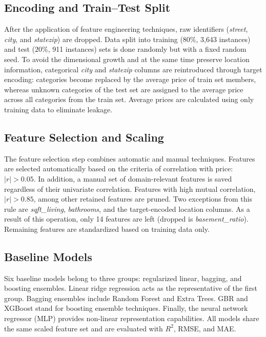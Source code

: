 \documentclass[conference]{IEEEtran}
\begin{document}
\subsection{Encoding and Train–Test Split}
After the application of feature engineering techniques, raw identifiers (\textit{street}, \textit{city}, and \textit{statezip}) are dropped. Data split into training ($80\%$, 3,643 instances) and test ($20\%$, 911 instances) sets is done randomly but with a fixed random seed. To avoid the dimensional growth and at the same time preserve location information, categorical \textit{city} and \textit{statezip} columns are reintroduced through target encoding: categories become replaced by the average price of train set members, whereas unknown categories of the test set are assigned to the average price across all categories from the train set. Average prices are calculated using only training data to eliminate leakage. 

\subsection{Feature Selection and Scaling}
The feature selection step combines automatic and manual techniques. Features are selected automatically based on the criteria of correlation with price: $|r| > 0.05$. In addition, a manual set of domain-relevant features is saved regardless of their univariate correlation. Features with high mutual correlation, $|r|>0.85$, among other retained features are pruned. Two exceptions from this rule are \textit{sqft\_living}, \textit{bathrooms}, and the target-encoded location columns. As a result of this operation, only 14 features are left (dropped is \textit{basement\_ratio}). Remaining features are standardized based on training data only.

\subsection{Baseline Models}
Six baseline models belong to three groups: regularized linear, bagging, and boosting ensembles. Linear ridge regression acts as the representative of the first group. Bagging ensembles include Random Forest and Extra Trees. GBR and XGBoost stand for boosting ensemble techniques. Finally, the neural network regressor (MLP) provides non-linear representation capabilities. All models share the same scaled feature set and are evaluated with $R^{2}$, RMSE, and MAE.
\end{document}
